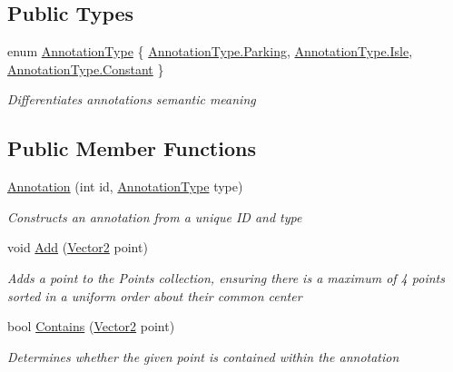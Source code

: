 \subsection*{Public Types}
\begin{DoxyCompactItemize}
\item 
enum \mbox{\hyperlink{class_eagle_eye_1_1_models_1_1_annotation_a38b72003ea887909fe12d6382092f7d9}{Annotation\+Type}} \{ \mbox{\hyperlink{class_eagle_eye_1_1_models_1_1_annotation_a38b72003ea887909fe12d6382092f7d9abaaacd7280e91aface947a1cc19d0f79}{Annotation\+Type.\+Parking}}, 
\mbox{\hyperlink{class_eagle_eye_1_1_models_1_1_annotation_a38b72003ea887909fe12d6382092f7d9a20f769ca3c0a534fb6a628e793f3b84a}{Annotation\+Type.\+Isle}}, 
\mbox{\hyperlink{class_eagle_eye_1_1_models_1_1_annotation_a38b72003ea887909fe12d6382092f7d9acb17869fe51048b5a5c4c6106551a255}{Annotation\+Type.\+Constant}}
 \}
\begin{DoxyCompactList}\small\item\em Differentiates annotation\textquotesingle{}s semantic meaning \end{DoxyCompactList}\end{DoxyCompactItemize}
\subsection*{Public Member Functions}
\begin{DoxyCompactItemize}
\item 
\mbox{\hyperlink{class_eagle_eye_1_1_models_1_1_annotation_a7dbb2b3cc18d9a83a530bb59172532e8}{Annotation}} (int id, \mbox{\hyperlink{class_eagle_eye_1_1_models_1_1_annotation_a38b72003ea887909fe12d6382092f7d9}{Annotation\+Type}} type)
\begin{DoxyCompactList}\small\item\em Constructs an annotation from a unique ID and type \end{DoxyCompactList}\item 
void \mbox{\hyperlink{class_eagle_eye_1_1_models_1_1_annotation_a47912a5775f0ead932d1cddb43213cd1}{Add}} (\mbox{\hyperlink{struct_eagle_eye_1_1_models_1_1_geometry_1_1_vector2}{Vector2}} point)
\begin{DoxyCompactList}\small\item\em Adds a point to the Points collection, ensuring there is a maximum of 4 points sorted in a uniform order about their common center \end{DoxyCompactList}\item 
bool \mbox{\hyperlink{class_eagle_eye_1_1_models_1_1_annotation_afa6be3269640630b76dce0c9dee1a239}{Contains}} (\mbox{\hyperlink{struct_eagle_eye_1_1_models_1_1_geometry_1_1_vector2}{Vector2}} point)
\begin{DoxyCompactList}\small\item\em Determines whether the given point is contained within the annotation \end{DoxyCompactList}\end{DoxyCompactItemize}
